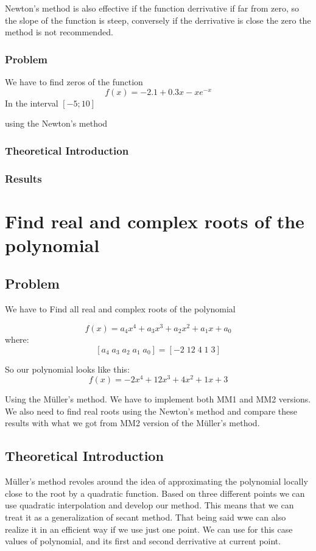 \documentclass[12pt]{report}
\begin{document}
Newton's method is also effective if the function derrivative if far from zero, so the slope of the function is steep, conversely if the derrivative is close the zero the method is not recommended.

\subsection{Problem}

We have to find zeros of the function
\[ f(x) = -2.1 + 0.3x - xe^{-x} \]
In the interval $[-5; 10]$

using the Newton's method
\subsection{Theoretical Introduction}
\subsection{Results}


\chapter{Find real and complex roots of the polynomial}

\section{Problem}

We have to Find all real and complex roots of the polynomial

\[ f(x) = a_4x^4+a_3x^3+a_2x^2+a_1x+a_0 \]
where:
\[ [a_4 \; a_3 \; a_2 \; a_1 \; a_0] = [-2 \; 12 \; 4 \; 1 \; 3] \]

So our polynomial looks like this:
\[ f(x) = -2x^4+12x^3+4x^2+1x+3 \]

Using the M{\"u}ller's method. We have to implement both MM1 and MM2 versions. We also need to find real roots using the Newton's method and compare these results with what we got from MM2 version of the M{\"u}ller's method.
\section{Theoretical Introduction}
M{\"u}ller's method revoles around the idea of approximating the polynomial locally close to the root by a quadratic function. Based on three different points we can use quadratic interpolation and develop our method. This means that we can treat it as a generalization of secant method. That being said wwe can also realize it in an efficient way if we use just one point. We can use for this case values of polynomial, and its first and second derrivative at current point.
\end{document}
